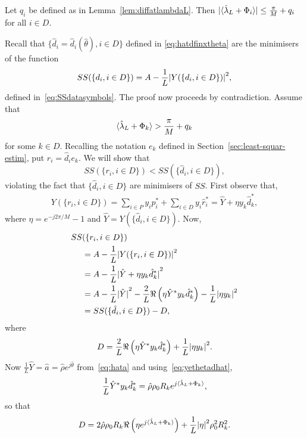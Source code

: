 \documentclass[journal]{IEEEtran}
\begin{document}
\begin{lemma}\label{lem:fracpartlambdahatnotpi} Let $q_i$ be defined as in Lemma~\ref{lem:diffatlambdaL}.  Then ${\vert \langle \hat{\lambda}_L + \Phi_i \rangle \vert} \leq \frac{\pi}{M} + q_i$ for all $i \in D$.
\end{lemma}
\begin{IEEEproof}
Recall that $\{\hat{d}_i = \hat{d}_i(\hat{\theta}), i \in D\}$ defined in \eqref{eq:hatdfinxtheta} are the minimisers of the function 
\[
SS(\{d_i, i \in D\}) = A - \frac{1}{L}{\vert Y(\{d_i, i \in D\}) \vert}^2,
\]
defined in~\eqref{eq:SSdatasymbols}. The proof now proceeds by contradiction.  Assume that 
\begin{equation}\label{eq:fraclambassumption}
\langle \hat{\lambda}_L + \Phi_k \rangle > \frac{\pi}{M} + q_k
\end{equation}
for some $k \in D$.  Recalling the notation $e_k$ defined in Section~\ref{sec:least-squar-estim}, put $r_i = \hat{d}_i e_k$.  We will show that 
\[
SS(\{r_i, i \in D\}) < SS(\{\hat{d}_i, i \in D\}),
\]
violating the fact that $\{\hat{d}_i, i \in D\}$ are minimisers of $SS$.  First observe that,
\begin{align*}
Y(\{ r_i, i \in D\}) = \sum_{i \in P} y_ip_i^* + \sum_{i \in D} y_i\hat{r}_i^* = \hat{Y} + \eta y_k\hat{d}_k^*,
\end{align*}
where $\eta = e^{-j2\pi/M} - 1$ and $\hat{Y} = Y(\{ \hat{d}_i, i \in D\})$.  Now,
\begin{align*}
SS&(\{r_i, i \in D\}) \\
&= A - \frac{1}{L} {\vert  Y(\{ r_i, i \in D\})  \vert}^2 \\
&= A - \frac{1}{L} {\vert  \hat{Y} + \eta y_k\hat{d}_k^*  \vert}^2 \\
&= A - \frac{1}{L}{\vert \hat{Y} \vert}^2 - \frac{2}{L}\Re\left(\eta \hat{Y}^* y_k \hat{d}_k^* \right) -  \frac{1}{L}{\vert  \eta y_k \vert}^2\\
&= SS(\{\hat{d}_i, i \in D\}) - D,
\end{align*}
where 
\[
D = \frac{2}{L}\Re\left(\eta \hat{Y}^* y_k \hat{d}_k^* \right) +  \frac{1}{L}{\vert  \eta y_k  \vert}^2.
\]
Now $\frac{1}{L}\hat{Y} = \hat{a} = \hat{\rho} e^{j\hat{\theta}}$ from~\eqref{eq:hata} and using~\eqref{eq:yethetadhat},
\[
\frac{1}{L} \hat{Y}^* y_k \hat{d}_k^* = \hat{\rho} \rho_0 R_k e^{j\langle \hat{\lambda}_L + \Phi_k \rangle},
\]
so that
\begin{equation}\label{eq:Ddefn}
D = 2 \hat{\rho} \rho_0 R_k \Re\left( \eta e^{j\langle \hat{\lambda}_L + \Phi_k \rangle}\right) + \frac{1}{L}{\vert \eta \vert}^2\rho_0^2 R_k^2.
\end{equation}

\end{IEEEproof}
\end{document}
